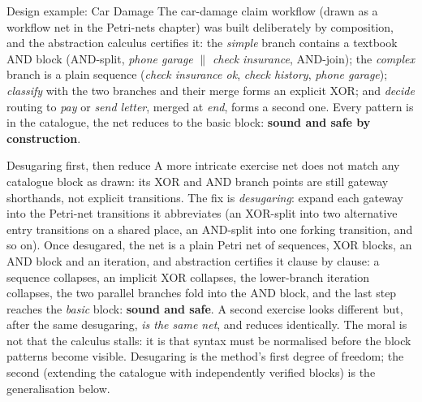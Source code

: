 \begin{examplebox}{Design example: Car Damage}
The car-damage claim workflow (drawn as a workflow net in the Petri-nets chapter) was built deliberately by composition, and the abstraction calculus certifies it: the \emph{simple} branch contains a textbook AND block (AND-split, \emph{phone garage} $\parallel$ \emph{check insurance}, AND-join); the \emph{complex} branch is a plain sequence (\emph{check insurance ok}, \emph{check history}, \emph{phone garage}); \emph{classify} with the two branches and their merge forms an explicit XOR; and \emph{decide} routing to \emph{pay} or \emph{send letter}, merged at \emph{end}, forms a second one. Every pattern is in the catalogue, the net reduces to the basic block: \textbf{sound and safe by construction}.
\end{examplebox}

\begin{examplebox}{Desugaring first, then reduce}
A more intricate exercise net does not match any catalogue block as drawn: its XOR and AND branch points are still gateway shorthands, not explicit transitions. The fix is \emph{desugaring}: expand each gateway into the Petri-net transitions it abbreviates (an XOR-split into two alternative entry transitions on a shared place, an AND-split into one forking transition, and so on). Once desugared, the net is a plain Petri net of sequences, XOR blocks, an AND block and an iteration, and abstraction certifies it clause by clause: a sequence collapses, an implicit XOR collapses, the lower-branch iteration collapses, the two parallel branches fold into the AND block, and the last step reaches the \emph{basic} block: \textbf{sound and safe}. A second exercise looks different but, after the same desugaring, \emph{is the same net}, and reduces identically. The moral is not that the calculus stalls: it is that syntax must be normalised before the block patterns become visible. Desugaring is the method's first degree of freedom; the second (extending the catalogue with independently verified blocks) is the generalisation below.
\end{examplebox}

